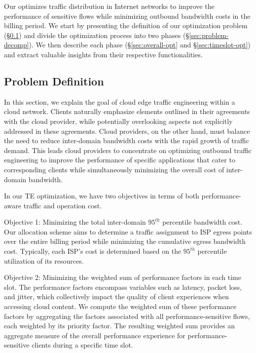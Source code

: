 Our {\sys} optimizes traffic distribution in Internet networks to improve the performance of sensitive flows while minimizing outbound bandwidth costs in the billing period.  We start by presenting the definition of our optimization problem (\S\ref{sec:problem-def}) and divide the optimization process into two phases (\S\ref{sec:problem-decomp}). We then describe each phase (\S\ref{sec:overall-opt} and \S\ref{sec:timeslot-opt}) and extract valuable insights from their respective functionalities.

\subsection{Problem Definition} \label{sec:problem-def}
In this section, we explain the goal of cloud edge traffic engineering within a cloud network. Clients naturally emphasize elements outlined in their agreements with the cloud provider, while potentially overlooking aspects not explicitly addressed in these agreements. Cloud providers, on the other hand, must balance the need to reduce inter-domain bandwidth costs with the rapid growth of traffic demand. This leads cloud providers to concentrate on optimizing outbound traffic engineering to improve the performance of specific applications that cater to corresponding clients while simultaneously minimizing the overall cost of inter-domain bandwidth.

In our TE optimization, we have two objectives in terms of both performance-aware traffic and operation cost. 

Objective 1: Minimizing the total inter-domain $95^{th}$ percentile bandwidth cost. Our allocation scheme aims to determine a traffic assignment to ISP egress points over the entire billing period while minimizing the cumulative egress bandwidth cost. Typically, each ISP's cost is determined based on the $95^{th}$ percentile utilization of its resources.

Objective 2: Minimizing the weighted sum of performance factors in each time slot. The performance factors encompass variables such as latency, packet loss, and jitter, which collectively impact the quality of client experiences when accessing cloud content. We compute the weighted sum of these performance factors by aggregating the factors associated with all performance-sensitive flows, each weighted by its priority factor. The resulting weighted sum provides an aggregate measure of the overall performance experience for performance-sensitive clients during a specific time slot.




